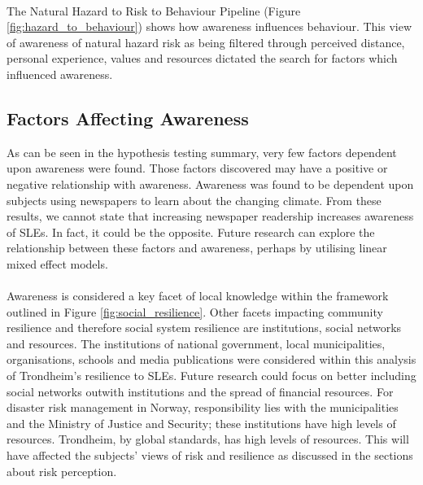 \paragraph{}
The Natural Hazard to Risk to Behaviour Pipeline (Figure \ref{fig:hazard_to_behaviour}) shows how awareness influences behaviour. This view of awareness of natural hazard risk as being filtered through perceived distance, personal experience, values and resources dictated the search for factors which influenced awareness. 



\subsection{Factors Affecting Awareness}
As can be seen in the hypothesis testing summary, very few factors dependent upon awareness were found. Those factors discovered may have a positive or negative relationship with awareness. Awareness was found to be dependent upon subjects using newspapers to learn about the changing climate. From these results, we cannot state that increasing newspaper readership increases awareness of SLEs. In fact, it could be the opposite. Future research can explore the relationship between these factors and awareness, perhaps by utilising linear mixed effect models.
\paragraph{}
Awareness is considered a key facet of local knowledge within the framework outlined in Figure \ref{fig:social_resilience}. Other facets impacting community resilience and therefore social system resilience are institutions, social networks and resources. The institutions of national government, local municipalities, organisations, schools and media publications were considered within this analysis of Trondheim's resilience to SLEs. Future research could focus on better including social networks outwith institutions and the spread of financial resources. For disaster risk management in Norway, responsibility lies with the municipalities and the Ministry of Justice and Security; these institutions have high levels of resources. Trondheim, by global standards, has high levels of resources. This will have affected the subjects' views of risk and resilience as discussed in the sections about risk perception. 
